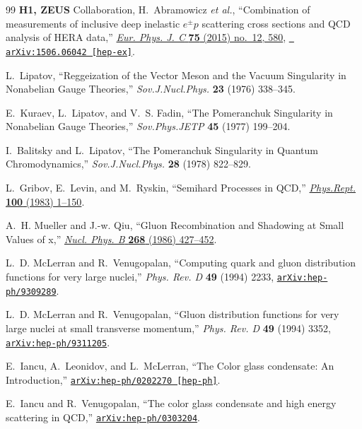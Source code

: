 \begin{thebibliography}{99}
{\bf H1, ZEUS} Collaboration, H.~Abramowicz {\em et al.}, ``{Combination of
  measurements of inclusive deep inelastic ${e^{\pm }p}$ scattering cross
  sections and QCD analysis of HERA data},''
  \href{http://dx.doi.org/10.1140/epjc/s10052-015-3710-4}{{\em Eur. Phys. J. C}
  {\bf 75} (2015) no.~12, 580}, \href{http://arxiv.org/abs/1506.06042}{{\tt
  arXiv:1506.06042 [hep-ex]}}.

L.~Lipatov, ``{Reggeization of the Vector Meson and the Vacuum Singularity in
  Nonabelian Gauge Theories},''
{\em Sov.J.Nucl.Phys.} {\bf 23} (1976)  338--345.

E.~Kuraev, L.~Lipatov, and V.~S. Fadin, ``{The Pomeranchuk Singularity in
  Nonabelian Gauge Theories},''
{\em Sov.Phys.JETP} {\bf 45} (1977)  199--204.

I.~Balitsky and L.~Lipatov, ``{The Pomeranchuk Singularity in Quantum
  Chromodynamics},''
{\em Sov.J.Nucl.Phys.} {\bf 28} (1978)  822--829.

L.~Gribov, E.~Levin, and M.~Ryskin, ``{Semihard Processes in QCD},''
\href{http://dx.doi.org/10.1016/0370-1573(83)90022-4}{{\em Phys.Rept.} {\bf
  100} (1983)  1--150}.

A.~H. Mueller and J.-w. Qiu, ``{Gluon Recombination and Shadowing at Small
  Values of x},'' \href{http://dx.doi.org/10.1016/0550-3213(86)90164-1}{{\em
  Nucl. Phys. B} {\bf 268} (1986)  427--452}.

L.~D. McLerran and R.~Venugopalan, ``{Computing quark and gluon distribution functions for very large nuclei},'' {\em Phys. Rev. D} {\bf 49} (1994) 2233, \href{http://arxiv.org/abs/hep-ph/9309289}{{\tt arXiv:hep-ph/9309289}}.

L.~D. McLerran and R.~Venugopalan, ``{Gluon distribution functions for very large nuclei at small transverse momentum},'' {\em Phys. Rev. D} {\bf 49} (1994) 3352, \href{http://arxiv.org/abs/hep-ph/9311205}{{\tt arXiv:hep-ph/9311205}}.

E.~Iancu, A.~Leonidov, and L.~McLerran, ``{The Color glass condensate: An
  Introduction},''
\href{http://arxiv.org/abs/hep-ph/0202270}{{\tt arXiv:hep-ph/0202270
  [hep-ph]}}.

E.~Iancu and R.~Venugopalan, ``{The color glass condensate and high energy
  scattering in QCD},''
\href{http://arxiv.org/abs/hep-ph/0303204}{{\tt arXiv:hep-ph/0303204}}.


\end{thebibliography}
